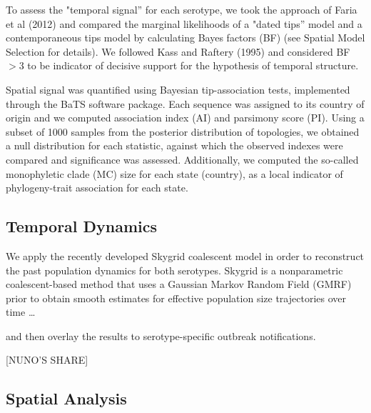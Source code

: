 \documentclass[10pt]{article}
\begin{document}
To assess the "temporal signal'' for each serotype, we took the approach of Faria et al (2012) \cite{Faria2012} and compared the marginal likelihoods of a "dated tips'' model and a contemporaneous tips model by calculating Bayes factors (BF) \cite{Suchard2001,KassRaftery1995} (see Spatial Model Selection for details).
We followed Kass and Raftery (1995) \cite{KassRaftery1995} and considered BF$>3$ to be indicator of decisive support for the hypothesis of temporal structure.

Spatial signal was quantified using Bayesian tip-association tests, implemented through the BaTS software package\cite{bats}.
Each sequence was assigned to its country of origin and we computed association index (AI) and parsimony score (PI).
Using a subset of 1000 samples from the posterior distribution of topologies, we obtained a null distribution for each statistic, against which the observed indexes were compared and significance was assessed.
Additionally, we computed the so-called monophyletic clade (MC) size for each state (country), as a local indicator of phylogeny-trait association for each state.


\subsection*{Temporal Dynamics}

We apply the recently developed Skygrid coalescent model \cite{skygrid} in order to reconstruct the past population dynamics for both serotypes. Skygrid is a nonparametric coalescent-based method that uses a Gaussian Markov Random Field (GMRF) prior to obtain smooth estimates for effective population size trajectories over time \ldots 

and then overlay the results to serotype-specific outbreak notifications.


\begin{center}
 [NUNO'S SHARE]
\end{center}


\subsection*{Spatial Analysis}
\end{document}
